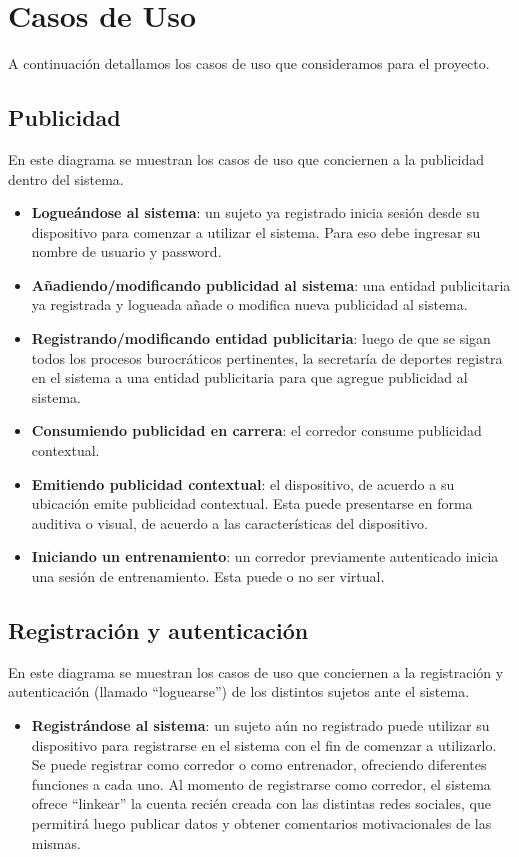 \section{Casos de Uso}

A continuación detallamos los casos de uso que consideramos para el proyecto.

\subsection{Publicidad}
En este diagrama se muestran los casos de uso que conciernen a la publicidad dentro del sistema.

\begin{itemize}
	\item \textbf{Logueándose al sistema}: un sujeto ya registrado inicia sesión desde su dispositivo para comenzar a utilizar el sistema. Para eso debe ingresar su nombre de usuario y password.
	\item \textbf{Añadiendo/modificando publicidad al sistema}: una entidad publicitaria ya registrada y logueada añade o modifica nueva publicidad al sistema.
	\item \textbf{Registrando/modificando entidad publicitaria}: luego de que se sigan todos los procesos burocráticos pertinentes, la secretaría de deportes registra en el sistema a una entidad publicitaria para que agregue publicidad al sistema.
	\item \textbf{Consumiendo publicidad en carrera}: el corredor consume publicidad contextual.
	\item \textbf{Emitiendo publicidad contextual}: el dispositivo, de acuerdo a su ubicación emite publicidad contextual. Esta puede presentarse en forma auditiva o visual, de acuerdo a las características del dispositivo.
	\item \textbf{Iniciando un entrenamiento}: un corredor previamente autenticado inicia una sesión de entrenamiento. Esta puede o no ser virtual.
\end{itemize}

\subsection{Registración y autenticación}
En este diagrama se muestran los casos de uso que conciernen a la registración y autenticación (llamado ``loguearse'') de los distintos sujetos ante el sistema. 

\begin{itemize}
	\item \textbf{Registrándose al sistema}: un sujeto aún no registrado puede utilizar su dispositivo para registrarse en el sistema con el fin de comenzar a utilizarlo. Se puede registrar como corredor o como entrenador, ofreciendo diferentes funciones a cada uno. Al momento de registrarse como corredor, el sistema ofrece ``linkear'' la cuenta recién creada con las distintas redes sociales, que permitirá luego publicar datos y obtener comentarios motivacionales de las mismas.
\end{itemize}


